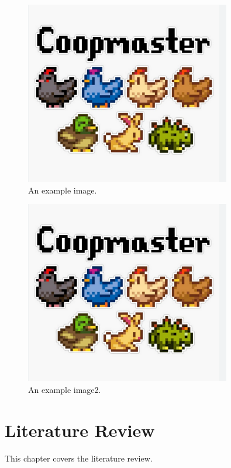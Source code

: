 \documentclass[12pt, a4paper]{report}
\begin{document}
    \begin{figure}[h!]
        \centering
        \includegraphics[width=0.8\textwidth]{images/coopmaster}
        \caption{An example image.}
        \label{fig:example3}

    \end{figure}

    \begin{figure}[h!]
        \centering
        \includegraphics[width=0.8\textwidth]{coopmaster.png}
        \caption{An example image2.}
        \label{fig:example2}
    \end{figure}


    \chapter{Literature Review}
    \label{chap:literature}
    This chapter covers the literature review.
\end{document}
